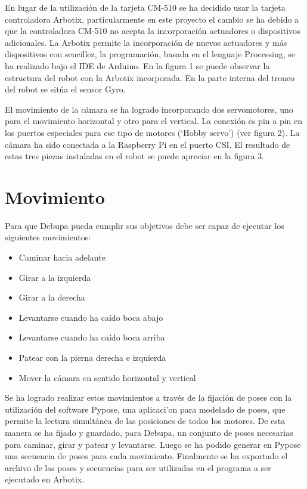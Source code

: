 \documentclass[conference, letterpaper]{IEEEtranMC1}
\begin{document}
En lugar de la utilización de la tarjeta CM-510 se ha decidido usar la tarjeta controladora Arbotix, particularmente en este proyecto el cambio se ha debido a que la controladora CM-510 no acepta la incorporación actuadores o dispositivos adicionales. La Arbotix permite la incorporación de nuevos actuadores y más dispositivos con sencillez, la programación, basada en el lenguaje Processing, se ha realizado bajo el IDE de Arduino. En la figura 1 se puede observar la estructura del robot con la Arbotix incorporada. En la parte interna del tronco del robot se sitúa el sensor Gyro. 

El movimiento de la cámara se ha logrado incorporando dos servomotores, uno para el movimiento horizontal y otro para el vertical. La conexión es pin a pin en los puertos especiales para ese tipo de motores (‘Hobby servo’) \cite{trossen} (ver figura 2). La cámara ha sido conectada a la Raspberry Pi en el puerto CSI. El resultado de estas tres piezas instaladas en el robot se puede apreciar en la figura 3.



\section{Movimiento}
\label{sec:movimiento}


Para que Debupa pueda cumplir sus objetivos debe ser capaz de ejecutar los siguientes movimientos:
\begin{itemize}
\setlength{\itemsep}{1pt}
\item Caminar hacia adelante
\item Girar a la izquierda
\item Girar a la derecha
\item Levantarse cuando ha caído boca abajo
\item Levantarse cuando ha caído boca arriba 
\item Patear con la pierna derecha e izquierda
\item Mover la cámara en sentido horizontal y vertical 

 
\end{itemize}

Se ha logrado realizar estos movimientos a través de la fijación de poses con la utilización del software Pypose, una aplicaci'on para modelado de poses, que permite la lectura simultánea de las posiciones de todos los motores. De esta manera se ha fijado y guardado, para Debupa, un conjunto de poses necesarias para caminar, girar y patear y levantarse. Luego se ha podido generar en Pypose una secuencia de poses para cada movimiento. Finalmente se ha exportado el archivo de las poses y secuencias para ser utilizadas en el programa a ser ejecutado en Arbotix. 
\end{document}
